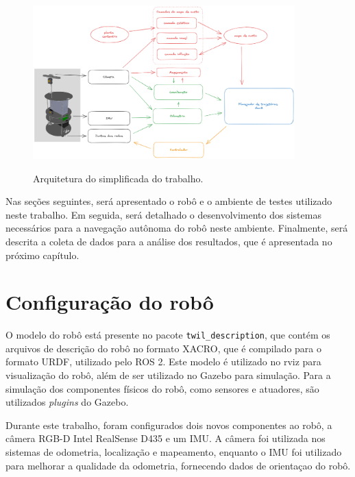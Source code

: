 \documentclass[repeatfields,xlists,xpacks,oneside,yearsonly]{ufrgscca}
\begin{document}
\begin{figure}[h]
    {
        \centering
        \caption{Arquitetura do simplificada do trabalho.}
        \label{fig:arq_trabalho}
        \includegraphics[width=0.9\textwidth]{arquitetura_simplificada.png}\\
    }
    {}
\end{figure}



Nas seções seguintes, será apresentado o robô e o ambiente de testes
utilizado neste trabalho.
Em seguida, será detalhado o desenvolvimento dos sistemas necessários
para a navegação autônoma do robô neste ambiente.
Finalmente, será descrita a coleta de dados para a análise dos resultados,
que é apresentada no próximo capítulo.

\section{Configuração do robô}



O modelo do robô está presente no pacote \texttt{twil\_description}, que contém
os arquivos de descrição do robô no formato XACRO, que é compilado para o formato
URDF, utilizado pelo ROS 2.
Este modelo é utilizado no rviz para visualização do robô, além de ser utilizado
no Gazebo para simulação.
Para a simulação dos componentes físicos do robô, como sensores e atuadores, 
são utilizados \textit{plugins} do Gazebo.


Durante este trabalho, foram configurados dois novos componentes ao robô, a câmera 
RGB-D Intel RealSense D435 e um IMU.
A câmera foi utilizada nos sistemas de odometria, localização e mapeamento, 
enquanto o IMU foi utilizado para melhorar a qualidade da odometria,
fornecendo dados de orientaçao do robô.
\end{document}
